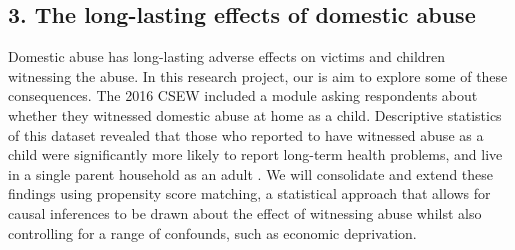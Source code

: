 \documentclass[11pt, a4paper]{article}
\begin{document}

%
%
%
%


\subsection*{3. The long-lasting effects of domestic abuse}

 Domestic abuse has long-lasting adverse effects on victims and children witnessing the abuse. In this research project, our is aim to explore some of these consequences. The 2016 CSEW included a module asking respondents about whether they witnessed domestic abuse at home as a child. Descriptive statistics of this dataset revealed that those who reported to have witnessed abuse as a child were significantly more likely to report long-term health problems, and live in a single parent household as an adult \cite{ONSChildhood}. We will consolidate and extend these findings using propensity score matching, a statistical approach that allows for causal inferences to be drawn about the effect of witnessing abuse whilst also controlling for a range of confounds, such as economic deprivation. 
\end{document}
